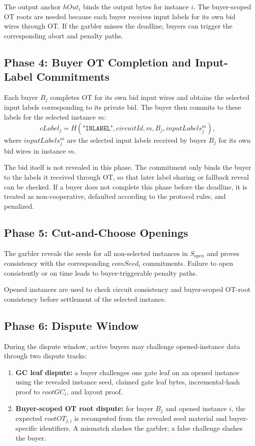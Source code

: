 \documentclass[final,twoside]{vutinfth}
\begin{document}
The output anchor $hOut_i$ binds the output bytes for instance $i$. The
buyer-scoped OT roots are needed because each buyer receives input labels for
its own bid wires through OT. If the garbler misses the deadline, buyers can
trigger the corresponding abort and penalty paths.

\subsection{Phase 4: Buyer OT Completion and Input-Label Commitments}
Each buyer $B_j$ completes OT for its own bid input wires and obtains the
selected input labels corresponding to its private bid. The buyer then commits
to these labels for the selected instance $m$:
\[
cLabel_j = H(\texttt{"INLABEL"}, circuitId, m, B_j, inputLabels^m_j),
\]
where $inputLabels^m_j$ are the selected input labels received by buyer $B_j$
for its own bid wires in instance $m$.

The bid itself is not revealed in this phase. The commitment only binds the
buyer to the labels it received through OT, so that later label sharing or
fallback reveal can be checked. If a buyer does not complete this phase before
the deadline, it is treated as non-cooperative, defaulted according to the
protocol rules, and penalized.

\subsection{Phase 5: Cut-and-Choose Openings}
The garbler reveals the seeds for all non-selected instances in $S_{open}$ and
proves consistency with the corresponding $comSeed_i$ commitments. Failure to
open consistently or on time leads to buyer-triggerable penalty paths.

Opened instances are used to check circuit consistency and buyer-scoped OT-root
consistency before settlement of the selected instance.

\subsection{Phase 6: Dispute Window}
During the dispute window, active buyers may challenge opened-instance data
through two dispute tracks:
\begin{enumerate}
\item \textbf{GC leaf dispute:} a buyer challenges one gate leaf on an opened
instance using the revealed instance seed, claimed gate leaf bytes,
incremental-hash proof to $rootGC_i$, and layout proof.

\item \textbf{Buyer-scoped OT root dispute:} for buyer $B_j$ and opened
instance $i$, the expected $rootOT_{j,i}$ is recomputed from the revealed seed
material and buyer-specific identifiers. A mismatch slashes the garbler; a
false challenge slashes the buyer.
\end{enumerate}
\end{document}
